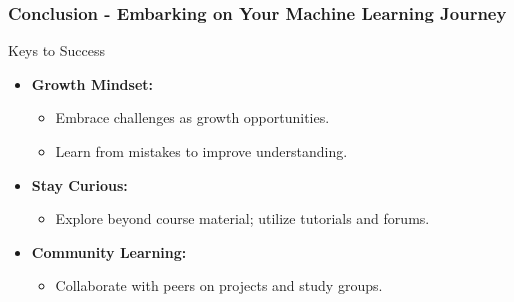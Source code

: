 \documentclass[aspectratio=169]{beamer}
\begin{document}
\begin{frame}[fragile]
    \frametitle{Conclusion - Embarking on Your Machine Learning Journey}
    \begin{block}{Keys to Success}
        \begin{itemize}
            \item \textbf{Growth Mindset:}
            \begin{itemize}
                \item Embrace challenges as growth opportunities.
                \item Learn from mistakes to improve understanding.
            \end{itemize}

            \item \textbf{Stay Curious:}
            \begin{itemize}
                \item Explore beyond course material; utilize tutorials and forums.
            \end{itemize}

            \item \textbf{Community Learning:}
            \begin{itemize}
                \item Collaborate with peers on projects and study groups.
            \end{itemize}
        \end{itemize}
    \end{block}
\end{frame}
\end{document}
